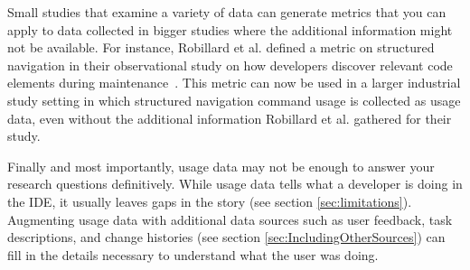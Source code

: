 

Small studies that examine a variety of data can generate metrics that you can apply to data collected in bigger studies where the additional information might not be available. 
        For instance, Robillard et al. defined a metric on structured navigation in their observational study on how developers discover relevant code elements during maintenance~\cite{wbsnipes:Robillard2004How}. This metric can now be used in a larger industrial study setting in which structured navigation command usage is collected as usage data, even without the additional information Robillard et al. gathered for their study.

Finally and most importantly, usage data may not be enough to answer your research questions definitively. While usage data tells what a developer is doing in the IDE, it usually leaves gaps in the story (see section \ref{sec:limitations}).  Augmenting usage data with additional data sources such as user feedback, task descriptions, and change histories (see section \ref{sec:IncludingOtherSources}) can fill in the details necessary to understand what the user was doing.